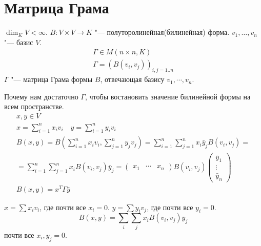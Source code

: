 ﻿\section{Матрица Грама}

\begin{Def}
	$\dim_K V < \infty$.
	$B \colon V \times V \to K$ "--- полуторолинейная(билинейная) форма.
	$v_1, \dots, v_n$ "--- базис $V$.
	\begin{gather*}
		\Gamma \in M(n \times n, K) \\
		\Gamma = (B(v_i, v_j))_{i,j=1..n}
	\end{gather*}
	$\Gamma$ "--- матрица Грама формы $B$, отвечающая базису $v_1, \cdots, v_n$.
\end{Def}


Почему нам достаточно $\Gamma$, чтобы востановить значение билинейной формы на всем пространстве.
\begin{gather*}
	x, y \in V \\
	x = \sum_{i=1}^n x_i v_i \quad y = \sum_{i=1}^n y_i v_i \\
	B(x, y)
	= B \left( \sum_{i=1}^n x_iv_i, \sum_{j=1}^n y_jv_j \right)
	= \sum_{i=1}^n \sum_{j=1}^n x_i \bar y_j B(v_i, v_j) = \\
	= \sum_{i=1}^n \sum_{j=1}^n x_i B(v_i, v_j) \bar y_j
	= \begin{pmatrix} x_1 & \cdots & x_n \end{pmatrix} B(v_i, v_j) \begin{pmatrix}\bar y_1 \\ \vdots \\ \bar y_n \end{pmatrix} \\
	B(x, y) = x^T\Gamma\bar y
\end{gather*}

\begin{Rem}
	$x = \sum x_i v_i$, где почти все $x_i = 0$.
	$y = \sum y_i v_j$, где почти все $y_i = 0$.
	\[ B(x, y) = \sum_i \sum_j x_i B(v_i, v_j) \bar y_j \]
	почти все $x_i, y_j = 0$.
\end{Rem}

